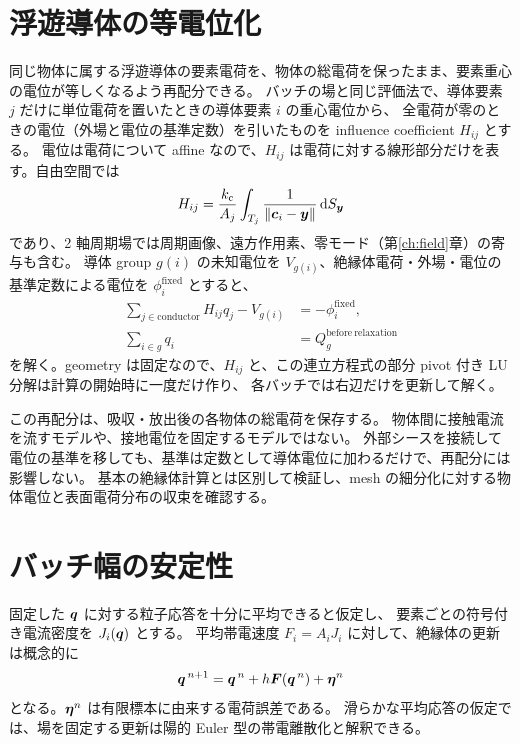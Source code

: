 \section{浮遊導体の等電位化}
同じ物体に属する浮遊導体の要素電荷を、物体の総電荷を保ったまま、要素重心の電位が等しくなるよう再配分できる。
バッチの場と同じ評価法で、導体要素 $j$ だけに単位電荷を置いたときの導体要素 $i$ の重心電位から、
全電荷が零のときの電位（外場と電位の基準定数）を引いたものを influence coefficient $H_{ij}$ とする。
電位は電荷について affine なので、$H_{ij}$ は電荷に対する線形部分だけを表す。自由空間では
\begin{equation}
 H_{ij}=\frac{k_{\mathrm c}}{A_j}\int_{T_j}
       \frac1{\lVert\bm{c}_i-\bm{y}\rVert}\mathop{}\!\mathrm{d} S_{\bm{y}}
\end{equation}
であり、2 軸周期場では周期画像、遠方作用素、零モード（第\ref{ch:field}章）の寄与も含む。
導体 group $g(i)$ の未知電位を $V_{g(i)}$、絶縁体電荷・外場・電位の基準定数による電位を $\phi_i^{\mathrm{fixed}}$ とすると、
\begin{align}
 \sum_{j\in\mathrm{conductor}}H_{ij}q_j-V_{g(i)}
   &=-\phi_i^{\mathrm{fixed}},\\
 \sum_{i\in g}q_i&=Q_g^{\mathrm{before\ relaxation}}
 \label{eq:conductor}
\end{align}
を解く。geometry は固定なので、$H_{ij}$ と、この連立方程式の部分 pivot 付き LU 分解は計算の開始時に一度だけ作り、
各バッチでは右辺だけを更新して解く。

この再配分は、吸収・放出後の各物体の総電荷を保存する。
物体間に接触電流を流すモデルや、接地電位を固定するモデルではない。
外部シースを接続して電位の基準を移しても、基準は定数として導体電位に加わるだけで、再配分には影響しない。
基本の絶縁体計算とは区別して検証し、mesh の細分化に対する物体電位と表面電荷分布の収束を確認する。

\section{バッチ幅の安定性}
固定した $\bm{q}$ に対する粒子応答を十分に平均できると仮定し、
要素ごとの符号付き電流密度を $J_i(\bm{q})$ とする。
平均帯電速度 $F_i=A_iJ_i$ に対して、絶縁体の更新は概念的に
\begin{equation}
 \bm{q}^{\,n+1}=\bm{q}^{\,n}+h\bm{F}(\bm{q}^{\,n})+\bm{\eta}^n
 \label{eq:mean_batch}
\end{equation}
となる。$\bm{\eta}^n$ は有限標本に由来する電荷誤差である。
滑らかな平均応答の仮定では、場を固定する更新は陽的 Euler 型の帯電離散化と解釈できる。

